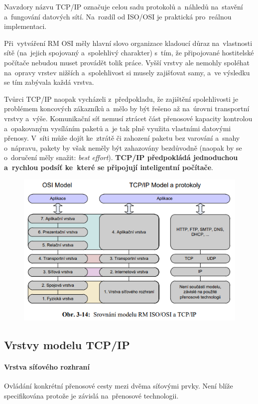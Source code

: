 Navzdory názvu TCP/IP označuje celou sadu protokolů a~náhledů na~stavění a~fungování datových sítí. Na~rozdíl od ISO/OSI je praktická pro~reálnou implementaci.

Při~vytváření RM OSI měly hlavní slovo organizace kladoucí důraz na~vlastnosti sítě (na~jejich spojovaný a~spolehlivý charakter) s~tím, že připojované hostitelské počítače nebudou muset provádět tolik práce. Vyšší vrstvy ale nemohly spoléhat na~opravy vrstev nižších a~spolehlivost si musely zajišťovat samy, a~ve výsledku se tím zabývala každá vrstva.

Tvůrci TCP/IP naopak vycházeli z~předpokladu, že zajištění spolehlivosti je problémem koncových zákazníků a~mělo by být řešeno až na~úrovni transportní vrstvy a~výše. Komunikační síť nemusí ztrácet část přenosové kapacity kontrolou a~opakovaným vysíláním paketů a~je tak plně využita vlastními datovými přenosy. V~síti může dojít ke~ztrátě či zahození paketu bez varování a~snahy o~nápravu, pakety by však neměly být zahazovány bezdůvodně (naopak by se o~doručení měly snažit: \emph{best effort}). \textbf{TCP/IP předpokládá jednoduchou a~rychlou podsíť ke~které se připojují inteligentní počítače}.

\begin{figure}[ht]
	\centering
	\includegraphics[width=\textwidth]{images/q03_osi_tcp}
\end{figure}

\subsection{Vrstvy modelu TCP/IP}

\paragraph{Vrstva síťového rozhraní} Ovládání konkrétní přenosové cesty mezi dvěma síťovými prvky. Není blíže specifikována protože je závislá na~přenosové technologii.

